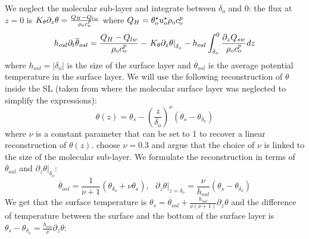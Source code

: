 \par
We neglect the molecular sub-layer and
integrate between $\delta_o$ and 0:
the flux at $z=0$ is
$K_\theta \partial_z \theta = \frac{Q_H - Q_{lw}}{\rho_{\rm o} c_{\rm o}^p}$
where $Q_H = \theta_o^\star u_o^\star \rho_{\rm o} c_{\rm o}^p$
\begin{equation}
\label{eq:evolEqOSL}
h_{osl}\partial_t \overline{\theta}_{osl} =
	\frac{Q_H - Q_{lw}}{\rho_{\rm o} c_{\rm o}^p}
- \left. K_\theta \partial_z \theta 
\right|_{\delta_{o}}
- h_{osl}\int_{\delta_o}^0
	\frac{\partial_z Q_{sw}}{\rho_{\rm o} c_{\rm o}^p} dz
\end{equation}
where $h_{osl} = |\delta_o|$
is the size of the surface layer and
$\overline{\theta}_{osl}$ is the average potential
temperature in the surface layer.
We will use the following reconstruction of $\theta$
inside the SL (taken from \citep{zeng_prognostic_2005}
where the molecular surface layer was neglected to simplify
the expressions):
\begin{equation}
	\label{eq:ND_Ocean_reconstructionSimpleTheta}
    \theta(z) = \theta_s -
    \left(\frac{z}{\delta_{o}}\right)^\nu \left( \theta_s - 
    \theta_{\delta_o}\right)
\end{equation}
where $\nu$ is a constant parameter that can be set to 1 to
recover a linear reconstruction of $\theta(z)$.
\cite{zeng_prognostic_2005} choose $\nu=0.3$ and argue that
the choice of $\nu$ is linked to the size of the molecular
sub-layer.
We formulate the reconstruction in terms of $\overline{\theta}_{osl}$
and $\left.\partial_z \theta\right|_{\delta_o}$:
\begin{equation}
    \overline{\theta}_{osl} = \frac{1}{\nu+1}
    (\theta_{\delta_o} + \nu \theta_s)
	, ~~~ \left.\partial_z \theta \right|_{z=\delta_o}
= \frac{\nu}{h_{osl}} (\theta_s - \theta_{\delta_o})
\end{equation}
We get that the surface temperature
is $\theta_s = \overline{\theta}_{osl}
+ \frac{h_{osl}}{\nu(\nu+1)} \partial_z \theta$ and
the difference of temperature between
the surface and the bottom of the surface layer is
$\theta_s - \theta_{\delta_o} = 
\frac{h_{osl}}{\nu}\partial_z \theta$:
